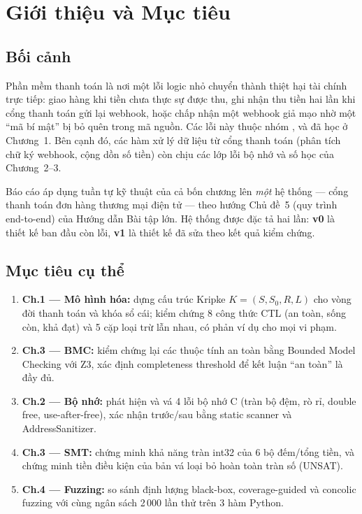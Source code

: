 \chapter{Giới thiệu và Mục tiêu}
\label{ch:gioithieu}

\section{Bối cảnh}
Phần mềm thanh toán là nơi một lỗi logic nhỏ chuyển thành thiệt hại tài chính trực tiếp:
giao hàng khi tiền chưa thực sự được thu, ghi nhận thu tiền hai lần khi cổng thanh toán gửi
lại webhook, hoặc chấp nhận một webhook giả mạo nhờ một ``mã bí mật'' bị bỏ quên trong mã
nguồn. Các lỗi này thuộc nhóm ,  và  đã học ở Chương~1. Bên cạnh đó, các hàm xử lý
dữ liệu từ cổng thanh toán (phân tích chữ ký webhook, cộng dồn số tiền) còn chịu các lớp lỗi
bộ nhớ và số học của Chương~2--3.

Báo cáo áp dụng tuần tự kỹ thuật của cả bốn chương lên \emph{một} hệ thống — cổng thanh
toán đơn hàng thương mại điện tử  — theo hướng Chủ đề~5 (quy trình
end-to-end) của Hướng dẫn Bài tập lớn. Hệ thống được đặc tả hai lần: \textbf{v0} là thiết kế
ban đầu còn lỗi, \textbf{v1} là thiết kế đã sửa theo kết quả kiểm chứng.

\section{Mục tiêu cụ thể}
\begin{enumerate}
  \item \textbf{Ch.1 — Mô hình hóa:} dựng cấu trúc Kripke $K=(S,S_0,R,L)$ cho vòng đời thanh
        toán và khóa sổ cái; kiểm chứng 8 công thức CTL (an toàn, sống còn, khả đạt) và 5 cặp
        loại trừ lẫn nhau, có phản ví dụ cho mọi vi phạm.
  \item \textbf{Ch.3 — BMC:} kiểm chứng lại các thuộc tính an toàn bằng Bounded Model Checking
        với Z3, xác định completeness threshold để kết luận ``an toàn'' là đầy đủ.
  \item \textbf{Ch.2 — Bộ nhớ:} phát hiện và vá 4 lỗi bộ nhớ C (tràn bộ đệm, rò rỉ, double
        free, use-after-free), xác nhận trước/sau bằng static scanner và AddressSanitizer.
  \item \textbf{Ch.3 — SMT:} chứng minh khả năng tràn int32 của 6 bộ đếm/tổng tiền, và chứng
        minh tiền điều kiện của bản vá loại bỏ hoàn toàn tràn số (UNSAT).
  \item \textbf{Ch.4 — Fuzzing:} so sánh định lượng black-box, coverage-guided và concolic
        fuzzing với cùng ngân sách 2\,000 lần thử trên 3 hàm Python.
\end{enumerate}


